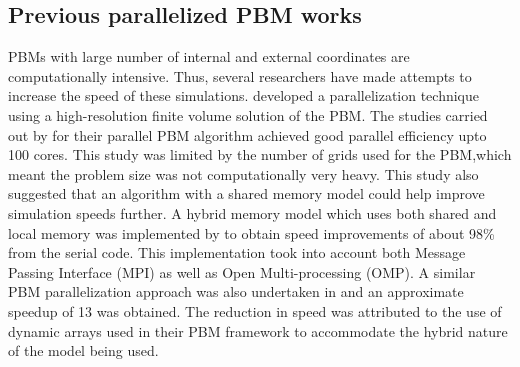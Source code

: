 \documentclass[review]{elsarticle}
\begin{document}
\begin{linenumbers}
\subsection{Previous parallelized PBM works}
PBMs with large number of internal and external coordinates are computationally intensive. 
Thus, several researchers have made attempts to increase 
the speed of these simulations. \cite{Gunawan2008} developed a parallelization technique 
using a high-resolution finite volume solution of the PBM. The studies carried out by 
\cite{Gunawan2008} for their parallel PBM algorithm achieved good parallel efficiency upto 
100 cores. This study was limited by the number of grids used for the PBM,which meant the 
problem size was not computationally very heavy. This study also suggested that an algorithm 
with a shared memory model could help improve simulation speeds further. A hybrid memory model 
which uses both shared and local memory was implemented by \cite{Bettencourt2017} to 
obtain speed improvements of about 98\% from the serial code. This implementation took 
into account both Message Passing Interface (MPI) as well as Open Multi-processing (OMP). 
A similar PBM parallelization approach was also undertaken in \cite{Sampat2018} and an 
approximate speedup of 13 was obtained. The reduction in speed was attributed to the use of 
dynamic arrays used in their PBM framework to accommodate the hybrid nature of the model 
being used. 


\end{linenumbers}
\end{document}
